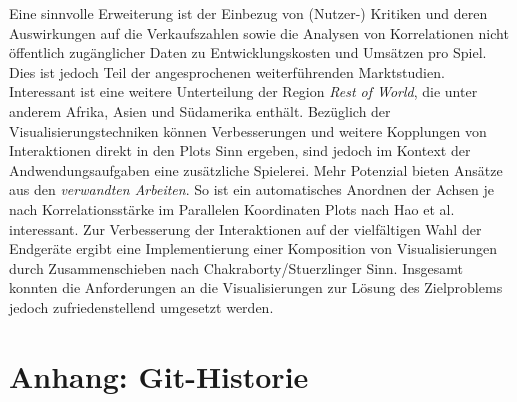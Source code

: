 \documentclass[usegeometry=true]{scrartcl}
\begin{document}
Eine sinnvolle Erweiterung ist der Einbezug von (Nutzer-) Kritiken und deren Auswirkungen auf die Verkaufszahlen 
sowie die Analysen von Korrelationen nicht öffentlich zugänglicher Daten zu Entwicklungskosten und Umsätzen pro Spiel.
Dies ist jedoch Teil der angesprochenen weiterführenden Marktstudien.
Interessant ist eine weitere Unterteilung der Region \textit{Rest of World}, die unter anderem Afrika, Asien und Südamerika enthält.
Bezüglich der Visualisierungstechniken können Verbesserungen und weitere Kopplungen von Interaktionen direkt in den Plots Sinn ergeben, 
sind jedoch im Kontext der Andwendungsaufgaben eine zusätzliche Spielerei.
Mehr Potenzial bieten Ansätze aus den \textit{verwandten Arbeiten}. 
So ist ein automatisches Anordnen der Achsen je nach Korrelationsstärke im Parallelen Koordinaten Plots nach Hao et al. interessant.\cite{Hao.2007}
Zur Verbesserung der Interaktionen auf der vielfältigen Wahl der Endgeräte ergibt eine Implementierung einer Komposition von Visualisierungen durch Zusammenschieben nach Chakraborty/Stuerzlinger Sinn.\cite{Chakraborty.2021}
Insgesamt konnten die Anforderungen an die Visualisierungen zur Lösung des Zielproblems jedoch zufriedenstellend umgesetzt werden.
\newpage
\section*{Anhang: Git-Historie}

\printbibliography
\end{document}

